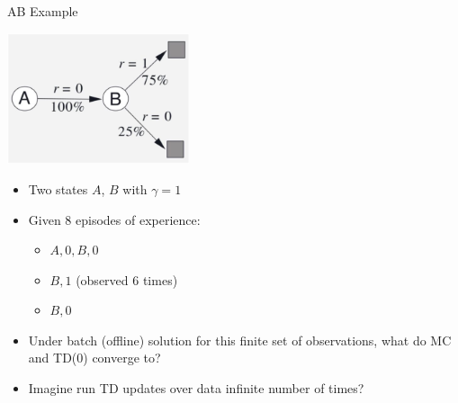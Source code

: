 \begin{frame}[c]{AB Example }
	
	\centering
	\includegraphics[width=0.4\textwidth]{images/ab_example.png}
	
	\begin{itemize}
		\item Two states $A$, $B$ with $\gamma = 1$
		\item Given $8$ episodes of experience:
		\begin{itemize}
			\item $A, 0, B, 0$
			\item $B, 1$ (observed $6$ times)
			\item $B, 0$ 
		\end{itemize}
		\item Under batch (offline) solution for this finite set of observations, what do MC and TD(0) converge to?
		\item Imagine run TD updates over data infinite number of times?
	\end{itemize}
	
\end{frame}
